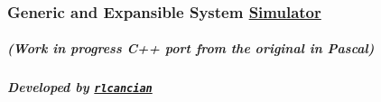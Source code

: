 \subsubsection*{Generic and Expansible System \hyperlink{class_simulator}{Simulator}}

\subparagraph*{(Work in progress C++ port from the original in Pascal)}

\subparagraph*{Developed by \href{https://github.com/rlcancian}{\tt rlcancian}}